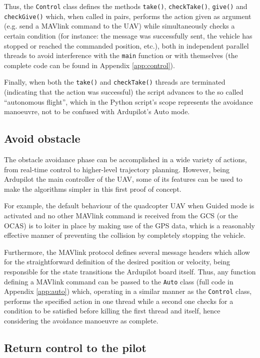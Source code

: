 Thus, the \texttt{Control} class defines the methods \texttt{take()}, \texttt{checkTake()}, \texttt{give()} and \texttt{checkGive()} which, when called in pairs, performs the action given as argument (e.g. send a MAVlink command to the UAV) while simultaneously checks a certain condition (for instance: the message was successfully sent, the vehicle has stopped or reached the commanded position, etc.), both in independent parallel threads to avoid interference with the \texttt{main} function or with themselves (the complete code can be found in Appendix \ref{app:control}).

Finally, when both the \texttt{take()} and \texttt{checkTake()} threads are terminated (indicating that the action was successful) the script advances to the so called ``autonomous flight'', which in the Python script's scope represents the avoidance manoeuvre, not to be confused with Ardupilot's Auto mode.

\subsection{Avoid obstacle} \label{sec:avoid}

The obstacle avoidance phase can be accomplished in a wide variety of actions, from real-time control to higher-level trajectory planning.
However, being Ardupilot the main controller of the UAV, some of its features can be used to make the algorithms simpler in this first proof of concept.

For example, the default behaviour of the quadcopter UAV when Guided mode is activated and no other MAVlink command is received from the GCS (or the OCAS) is to loiter in place by making use of the GPS data, which is a reasonably effective manner of preventing the collision by completely stopping the vehicle.

Furthermore, the MAVlink protocol defines several message headers which allow for the straightforward definition of the desired position or velocity, being responsible for the state transitions the Ardupilot board itself.
Thus, any function defining a MAVlink command can be passed to the \texttt{Auto} class (full code in Appendix \ref{app:auto}) which, operating in a similar manner as the \texttt{Control} class, performs the specified action in one thread while a second one checks for a condition to be satisfied before killing the first thread and itself, hence considering the avoidance manoeuvre as complete. 

\subsection{Return control to the pilot} \label{sec:returnControl}

